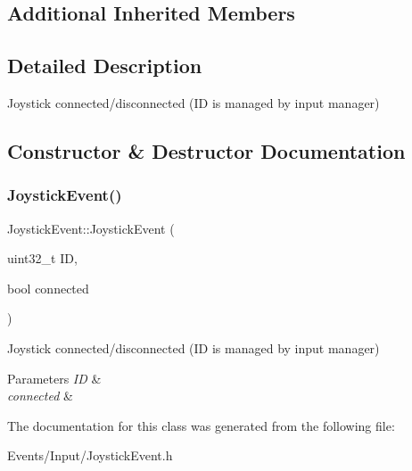 \subsection*{Additional Inherited Members}


\subsection{Detailed Description}
Joystick connected/disconnected (ID is managed by input manager) 

\subsection{Constructor \& Destructor Documentation}
\mbox{\label{classJoystickEvent_a9d24f7de04b58c919b406c75d83a6e8f}} 
\subsubsection{\texorpdfstring{Joystick\+Event()}{JoystickEvent()}}
{\footnotesize\ttfamily Joystick\+Event\+::\+Joystick\+Event (\begin{DoxyParamCaption}\item[{uint32\+\_\+t}]{ID,  }\item[{bool}]{connected }\end{DoxyParamCaption})\hspace{0.3cm}{\ttfamily [inline]}}



Joystick connected/disconnected (ID is managed by input manager) 


\begin{DoxyParams}{Parameters}
{\em ID} & \\
\hline
{\em connected} & \\
\hline
\end{DoxyParams}


The documentation for this class was generated from the following file\+:\begin{DoxyCompactItemize}
\item 
Events/\+Input/Joystick\+Event.\+h\end{DoxyCompactItemize}
